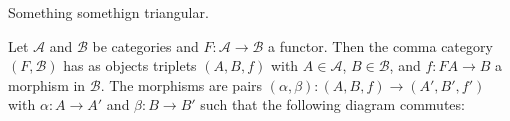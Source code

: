 Something somethign triangular.

\begin{defn}
	Let $\mathcal A$ and $\mathcal B$ be categories and $F:\mathcal A \to \mathcal B$ a functor. Then the comma category $(F, \mathcal  B)$ has as objects triplets $(A, B, f)$ with $A \in \mathcal  A$, $B \in \mathcal  B$, and $f: FA \to B$ a morphism in $\mathcal  B$. The morphisms are pairs $(\alpha, \beta):(A, B, f) \to (A', B', f')$ with $\alpha: A \to A'$ and $\beta: B \to B'$ such that the following diagram commutes:
	\begin{center}
	\end{center}
\end{defn}

